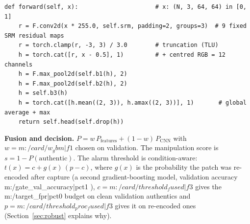 \begin{lstlisting}[style=py]
def forward(self, x):                      # x: (N, 3, 64, 64) in [0, 1]
    r = F.conv2d(x * 255.0, self.srm, padding=2, groups=3)  # 9 fixed SRM residual maps
    r = torch.clamp(r, -3, 3) / 3.0        # truncation (TLU)
    h = torch.cat([r, x - 0.5], 1)         # + centred RGB = 12 channels
    h = F.max_pool2d(self.b1(h), 2)
    h = F.max_pool2d(self.b2(h), 2)
    h = self.b3(h)
    h = torch.cat([h.mean((2, 3)), h.amax((2, 3))], 1)       # global average + max
    return self.head(self.drop(h))
\end{lstlisting}

\textbf{Fusion and decision.} $P = w\,P_{\text{features}} + (1-w)\,P_{\text{CNN}}$ with $w = {{m:/card/w_gbm|f1}}$ chosen on validation. The manipulation score is $s = 1 - P(\text{authentic})$. The alarm threshold is condition-aware: $t(x) = c + g(x)\,(p - c)$, where $g(x)$ is the probability the patch was re-encoded after capture (a second gradient-boosting model, validation accuracy {{m:/gate_val_accuracy|pct1}} \meas), $c = {{m:/card/threshold_fused|f3}}$ gives the {{m:/target_fpr|pct0}} budget on clean validation authentics and $p = {{m:/card/threshold_proc_fused|f3}}$ gives it on re-encoded ones (Section~\ref{sec:robust} explains why).

